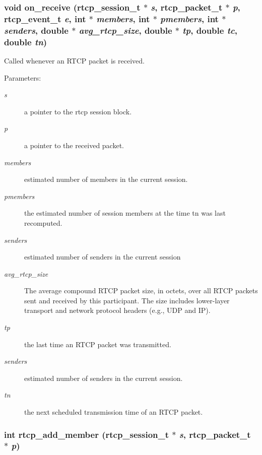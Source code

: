 \subsubsection{\setlength{\rightskip}{0pt plus 5cm}void on\_\-receive ({\bf rtcp\_\-session\_\-t} $\ast$ {\em s}, {\bf rtcp\_\-packet\_\-t} $\ast$ {\em p}, {\bf rtcp\_\-event\_\-t} {\em e}, int $\ast$ {\em members}, int $\ast$ {\em pmembers}, int $\ast$ {\em senders}, double $\ast$ {\em avg\_\-rtcp\_\-size}, double $\ast$ {\em tp}, double {\em tc}, double {\em tn})\hspace{0.3cm}{\tt  [static]}}\label{rtcp_8c_a15}


Called whenever an RTCP packet is received. \begin{Desc}
\item[Parameters:]
\begin{description}
\item[{\em s}]a pointer to the rtcp session block. \item[{\em p}]a pointer to the received packet. \item[{\em members}]estimated number of members in the current session. \item[{\em pmembers}]the estimated number of session members at the time tn was last recomputed. \item[{\em senders}]estimated number of senders in the current session \item[{\em avg\_\-rtcp\_\-size}]The average compound RTCP packet size, in octets, over all RTCP packets sent and received by this participant. The size includes lower-layer transport and network protocol headers (e.g., UDP and IP). \item[{\em tp}]the last time an RTCP packet was transmitted. \item[{\em senders}]estimated number of senders in the current session. \item[{\em tn}]the next scheduled transmission time of an RTCP packet. \end{description}
\end{Desc}
\subsubsection{\setlength{\rightskip}{0pt plus 5cm}int rtcp\_\-add\_\-member ({\bf rtcp\_\-session\_\-t} $\ast$ {\em s}, {\bf rtcp\_\-packet\_\-t} $\ast$ {\em p})}\label{rtcp_8c_a6}


